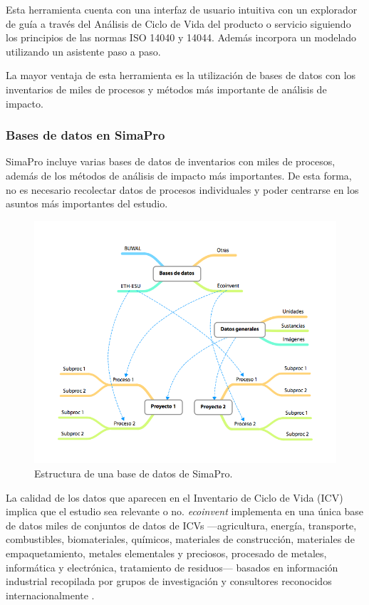 Esta herramienta cuenta con una interfaz de usuario intuitiva con un explorador de guía a través del Análisis de Ciclo de Vida del producto o servicio siguiendo los principios de las normas ISO 14040 y 14044. Además incorpora un modelado utilizando un asistente paso a paso.

La mayor ventaja de esta herramienta es la utilización de bases de datos con los inventarios de miles de procesos y métodos más importante de análisis de impacto.

\subsubsection{Bases de datos en SimaPro}
SimaPro incluye varias bases de datos de inventarios con miles de procesos, además de los métodos de análisis de impacto más importantes. De esta forma, no es necesario recolectar datos de procesos individuales y poder centrarse en los asuntos más importantes del estudio.

\begin{figure}[!htb]
\centering
\includegraphics[width=15cm]{bbddsimapro.png}
\caption{Estructura de una base de datos de SimaPro.}
\label{fig:bbddsimapro}
\end{figure}

La calidad de los datos que aparecen en el Inventario de Ciclo de Vida (ICV) implica que el estudio sea relevante o no. \textit{ecoinvent} implementa en una única base de datos miles de conjuntos de datos de ICVs —agricultura, energía, transporte, combustibles, biomateriales, químicos, materiales de construcción, materiales de empaquetamiento, metales elementales y preciosos, procesado de metales, informática y electrónica, tratamiento de residuos— basados en información industrial recopilada por grupos de investigación y consultores reconocidos internacionalmente \cite{website:ecoinvent}.

